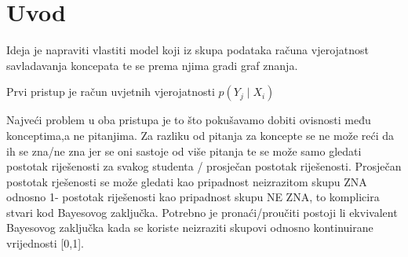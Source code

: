 \documentclass{report}
\begin{document}
	\chapter{Uvod}
	
	Ideja je napraviti vlastiti model koji iz skupa podataka računa vjerojatnost savladavanja koncepata te se prema njima gradi graf znanja.
	
	Prvi pristup je račun uvjetnih vjerojatnosti $p(Y_j\mid X_i)$
	
	Najveći problem u oba pristupa je to što pokušavamo dobiti ovisnosti među konceptima,a ne pitanjima. Za razliku od pitanja za koncepte se ne može reći da ih se zna/ne zna jer se oni sastoje od više pitanja te se može samo gledati postotak riješenosti za svakog studenta / prosječan postotak riješenosti. Prosječan postotak rješenosti se može gledati kao pripadnost neizrazitom skupu ZNA odnosno 1- postotak riješenosti kao pripadnost skupu NE ZNA, to komplicira stvari kod Bayesovog zaključka. Potrebno je pronaći/proučiti postoji li ekvivalent Bayesovog zaključka kada se koriste neizraziti skupovi odnosno kontinuirane vrijednosti [0,1].
	
\end{document}
